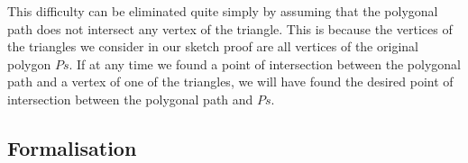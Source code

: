 This difficulty can be eliminated quite simply by assuming that the polygonal path does not intersect any vertex of the triangle. This is because the vertices of the triangles we consider in our sketch proof are all vertices of the original polygon $Ps$. If at any time we found a point of intersection between the polygonal path and a vertex of one of the triangles, we will have found the desired point of intersection between the polygonal path and $Ps$.\label{sec:NoVertexAssumption}


\subsection{Formalisation}




